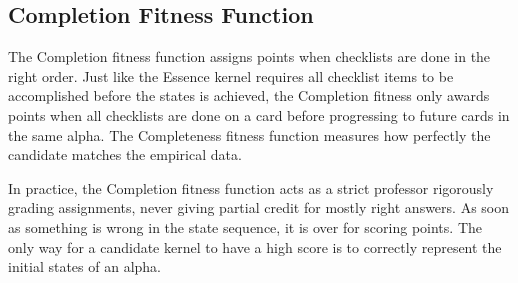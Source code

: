 \documentclass[3p,times,procedia]{elsarticle}
\begin{document}


\subsection{Completion Fitness Function}
The Completion fitness function assigns points when checklists are done in the right order. Just like the Essence kernel requires all checklist items to be accomplished before the states is achieved, the Completion fitness only awards points when all checklists are done on a card before progressing to future cards in the same alpha. The Completeness fitness function measures how perfectly the candidate matches the empirical data. 


In practice, the Completion fitness function acts as a strict professor rigorously grading assignments, never giving partial credit for mostly right answers. As soon as something is wrong in the state sequence, it is over for scoring points. The only way for a candidate kernel to have a high score is to correctly represent the initial states of an alpha.
\end{document}
